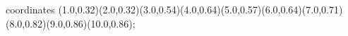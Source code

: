 					coordinates { (1.0,0.32)(2.0,0.32)(3.0,0.54)(4.0,0.64)(5.0,0.57)(6.0,0.64)(7.0,0.71)(8.0,0.82)(9.0,0.86)(10.0,0.86)};